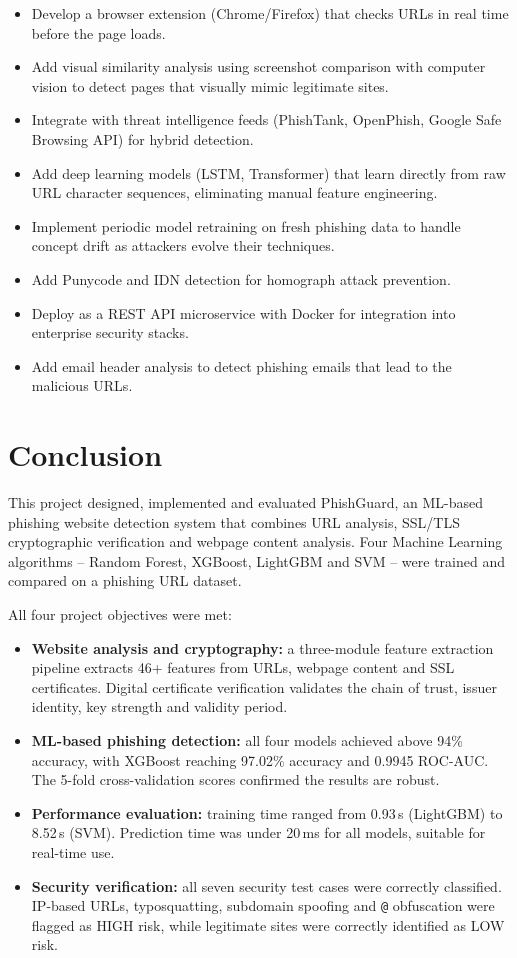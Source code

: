 \documentclass[11pt,a4paper]{article}
\begin{document}
\begin{itemize}
  \item Develop a browser extension (Chrome/Firefox) that checks URLs in real time before the page loads.
  \item Add visual similarity analysis using screenshot comparison with computer vision to detect pages that visually mimic legitimate sites.
  \item Integrate with threat intelligence feeds (PhishTank, OpenPhish, Google Safe Browsing API) for hybrid detection.
  \item Add deep learning models (LSTM, Transformer) that learn directly from raw URL character sequences, eliminating manual feature engineering.
  \item Implement periodic model retraining on fresh phishing data to handle concept drift as attackers evolve their techniques.
  \item Add Punycode and IDN detection for homograph attack prevention.
  \item Deploy as a REST API microservice with Docker for integration into enterprise security stacks.
  \item Add email header analysis to detect phishing emails that lead to the malicious URLs.
\end{itemize}

\section{Conclusion}

This project designed, implemented and evaluated PhishGuard, an ML-based phishing website detection system that combines URL analysis, SSL/TLS cryptographic verification and webpage content analysis. Four Machine Learning algorithms -- Random Forest, XGBoost, LightGBM and SVM -- were trained and compared on a phishing URL dataset.

All four project objectives were met:
\begin{itemize}
  \item \textbf{Website analysis and cryptography:} a three-module feature extraction pipeline extracts 46+ features from URLs, webpage content and SSL certificates. Digital certificate verification validates the chain of trust, issuer identity, key strength and validity period.
  \item \textbf{ML-based phishing detection:} all four models achieved above 94\% accuracy, with XGBoost reaching 97.02\% accuracy and 0.9945 ROC-AUC. The 5-fold cross-validation scores confirmed the results are robust.
  \item \textbf{Performance evaluation:} training time ranged from 0.93\,s (LightGBM) to 8.52\,s (SVM). Prediction time was under 20\,ms for all models, suitable for real-time use.
  \item \textbf{Security verification:} all seven security test cases were correctly classified. IP-based URLs, typosquatting, subdomain spoofing and \texttt{@} obfuscation were flagged as HIGH risk, while legitimate sites were correctly identified as LOW risk.
\end{itemize}
\end{document}
